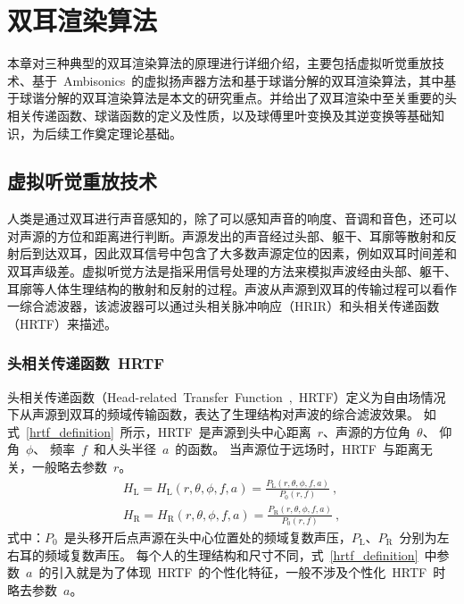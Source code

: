 \chapter{双耳渲染算法 }

本章对三种典型的双耳渲染算法的原理进行详细介绍，主要包括虚拟听觉重放技术、基于~Ambisonics~的虚拟扬声器方法和基于球谐分解的双耳渲染算法，其中基于球谐分解的双耳渲染算法是本文的研究重点。并给出了双耳渲染中至关重要的头相关传递函数、球谐函数的定义及性质，以及球傅里叶变换及其逆变换等基础知识，为后续工作奠定理论基础。

\section{虚拟听觉重放技术}


人类是通过双耳进行声音感知的，除了可以感知声音的响度、音调和音色，还可以对声源的方位和距离进行判断。声源发出的声音经过头部、躯干、耳廓等散射和反射后到达双耳，因此双耳信号中包含了大多数声源定位的因素，例如双耳时间差和双耳声级差。虚拟听觉方法是指采用信号处理的方法来模拟声波经由头部、躯干、耳廓等人体生理结构的散射和反射的过程。声波从声源到双耳的传输过程可以看作一综合滤波器，该滤波器可以通过头相关脉冲响应（HRIR）和头相关传递函数（HRTF）来描述。


\subsection{头相关传递函数~HRTF}
头相关传递函数（Head-related~Transfer~Function~,~HRTF）定义为自由场情况下从声源到双耳的频域传输函数，表达了生理结构对声波的综合滤波效果。
如式~\eqref{hrtf_definition}~所示，HRTF~是声源到头中心距离~$r$、声源的方位角~$\theta$、 仰角~$\phi$、 频率~$f$~和人头半径~$a$~的函数。
当声源位于远场时，HRTF~与距离无关，一般略去参数~$r$。
\begin{equation}
\begin{split}
H_{\text{L}} = H_{\text{L}}(r,\theta,\phi,f,a)=\frac{P_{\text{L}}(r,\theta,\phi,f,a)}{P_{0}(r,f)}~, \\
H_{\text{R}} = H_{\text{R}}(r,\theta,\phi,f,a)=\frac{P_{\text{R}}(r,\theta,\phi,f,a)}{P_{0}(r,f)}~,
\end{split}
\label{hrtf_definition}
\end{equation}
式中：$P_{0}$~是头移开后点声源在头中心位置处的频域复数声压，$P_{\text{L}}$、$P_{\text{R}}$~分别为左右耳的频域复数声压。
每个人的生理结构和尺寸不同，式~\eqref{hrtf_definition}~中参数~$a$~的引入就是为了体现~HRTF~的个性化特征，一般不涉及个性化~HRTF~时略去参数~$a$。

